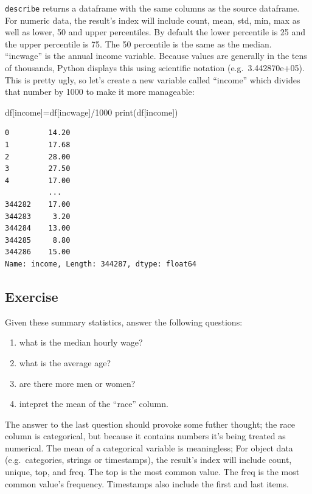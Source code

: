 \documentclass[
  letterpaper,
  DIV=11,
  numbers=noendperiod]{scrreprt}
\newenvironment{Shaded}{\begin{snugshade}}{\end{snugshade}}
\newcommand{\BuiltInTok}[1]{\textcolor[rgb]{0.00,0.23,0.31}{#1}}
\newcommand{\DecValTok}[1]{\textcolor[rgb]{0.68,0.00,0.00}{#1}}
\newcommand{\NormalTok}[1]{\textcolor[rgb]{0.00,0.23,0.31}{#1}}
\newcommand{\OperatorTok}[1]{\textcolor[rgb]{0.37,0.37,0.37}{#1}}
\newcommand{\StringTok}[1]{\textcolor[rgb]{0.13,0.47,0.30}{#1}}
\providecommand{\tightlist}{%
  \setlength{\itemsep}{0pt}\setlength{\parskip}{0pt}}\usepackage{longtable,booktabs,array}
\begin{document}
\texttt{describe} returns a dataframe with the same columns as the
source dataframe. For numeric data, the result's index will include
count, mean, std, min, max as well as lower, 50 and upper percentiles.
By default the lower percentile is 25 and the upper percentile is 75.
The 50 percentile is the same as the median. ``incwage'' is the annual
income variable. Because values are generally in the tens of thousands,
Python displays this using scientific notation (e.g.~3.442870e+05). This
is pretty ugly, so let's create a new variable called ``income'' which
divides that number by 1000 to make it more manageable:

\begin{Shaded}
\begin{Highlighting}[]
\NormalTok{df[}\StringTok{\textquotesingle{}income\textquotesingle{}}\NormalTok{]}\OperatorTok{=}\NormalTok{df[}\StringTok{\textquotesingle{}incwage\textquotesingle{}}\NormalTok{]}\OperatorTok{/}\DecValTok{1000}
\BuiltInTok{print}\NormalTok{(df[}\StringTok{\textquotesingle{}income\textquotesingle{}}\NormalTok{])}
\end{Highlighting}
\end{Shaded}

\begin{verbatim}
0         14.20
1         17.68
2         28.00
3         27.50
4         17.00
          ...  
344282    17.00
344283     3.20
344284    13.00
344285     8.80
344286    15.00
Name: income, Length: 344287, dtype: float64
\end{verbatim}

\hypertarget{exercise-18}{%
\subsection{Exercise}\label{exercise-18}}

Given these summary statistics, answer the following questions:

\begin{enumerate}
\def\labelenumi{\arabic{enumi}.}
\tightlist
\item
  what is the median hourly wage?
\item
  what is the average age?
\item
  are there more men or women?
\item
  intepret the mean of the ``race'' column.
\end{enumerate}

The answer to the last question should provoke some futher thought; the
race column is categorical, but because it contains numbers it's being
treated as numerical. The mean of a categorical variable is meaningless;
For object data (e.g.~categories, strings or timestamps), the result's
index will include count, unique, top, and freq. The top is the most
common value. The freq is the most common value's frequency. Timestamps
also include the first and last items.
\end{document}
